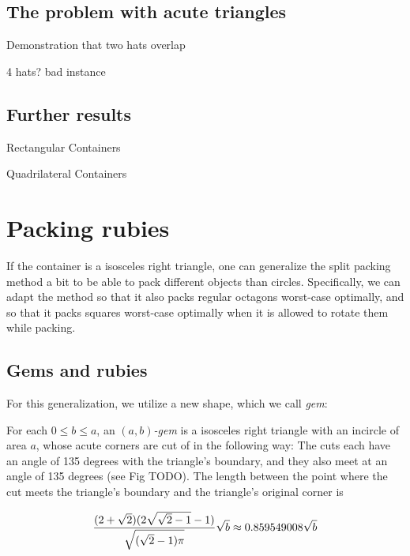 \documentclass[a4paper,style=print,bibliography=totoc,nexus,lnum,extramargin]{tubsbook}
\begin{document}
%
%

\section{The problem with acute triangles}

Demonstration that two hats overlap

4 hats? bad instance

\section{Further results}

Rectangular Containers

Quadrilateral Containers

\chapter{Packing rubies}

If the container is a isosceles right triangle, one can generalize the split packing method a bit to be able to pack different objects than circles. Specifically, we can adapt the method so that it also packs regular octagons worst-case optimally, and so that it packs squares worst-case optimally when it is allowed to rotate them while packing.

\section{Gems and rubies}

For this generalization, we utilize a new shape, which we call \emph{gem}:

\begin{definition}
    For each $0 \le b \le a$, an \emph{$(a,b)$-gem} is a isosceles right triangle with an incircle of area $a$, whose acute corners are cut of in the following way: The cuts each have an angle of 135 degrees with the triangle's boundary, and they also meet at an angle of 135 degrees (see Fig TODO). The length between the point where the cut meets the triangle's boundary and the triangle's original corner is

    $$\frac{(2+\sqrt{2})(2\sqrt{\sqrt{2}-1}-1)}{\sqrt{(\sqrt{2}-1)\pi}}\sqrt{b} \approx 0.859549008 \sqrt{b}$$
\end{definition}
\end{document}
